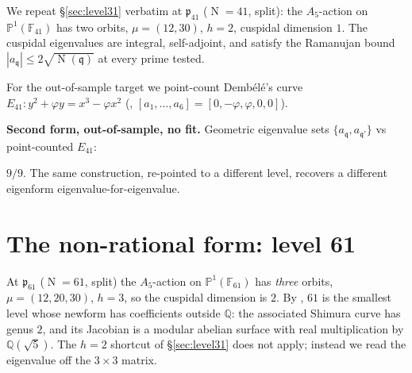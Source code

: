 \documentclass[11pt,a4paper]{article}
\newcommand{\Q}{\mathbb{Q}}
\newcommand{\F}{\mathbb{F}}
\newcommand{\PP}{\mathbb{P}}
\newcommand{\fp}{\mathfrak{p}}
\newcommand{\fq}{\mathfrak{q}}
\DeclareMathOperator{\Nm}{N}
\begin{document}
We repeat \S\ref{sec:level31} verbatim at $\fp_{41}$ ($\Nm=41$, split):
the $A_5$-action on $\PP^1(\F_{41})$ has two orbits, $\mu=(12,30)$,
$h=2$, cuspidal dimension $1$. The cuspidal eigenvalues are integral,
self-adjoint, and satisfy the Ramanujan bound
$|a_\fq|\le2\sqrt{\Nm(\fq)}$ at every prime tested.

For the out-of-sample target we point-count Demb\'el\'e's curve
$E_{41}:y^2+\varphi y=x^3-\varphi x^2$
(\cite[Tab.~4]{Dembele2005}, $[a_1,\dots,a_6]=[0,-\varphi,\varphi,0,0]$).

\begin{verifiedbox}
\textbf{Second form, out-of-sample, no fit.} Geometric eigenvalue sets
$\{a_\fq,a_{\fq'}\}$ vs point-counted $E_{41}$:
\begin{center}\end{center}
$9/9$. The same construction, re-pointed to a different level, recovers
a different eigenform eigenvalue-for-eigenvalue.
\end{verifiedbox}

\section{The non-rational form: level 61}\label{sec:level61}

At $\fp_{61}$ ($\Nm=61$, split) the $A_5$-action on $\PP^1(\F_{61})$ has
\emph{three} orbits, $\mu=(12,20,30)$, $h=3$, so the cuspidal dimension
is $2$. By \cite[Rem.~4.4]{Dembele2005}, $61$ is the smallest level
whose newform has coefficients outside $\Q$: the associated Shimura
curve has genus $2$, and its Jacobian is a modular abelian surface with
real multiplication by $\Q(\sqrt5)$. The $h=2$ shortcut of
\S\ref{sec:level31} does not apply; instead we read the eigenvalue off
the $3\times3$ matrix.
\end{document}
